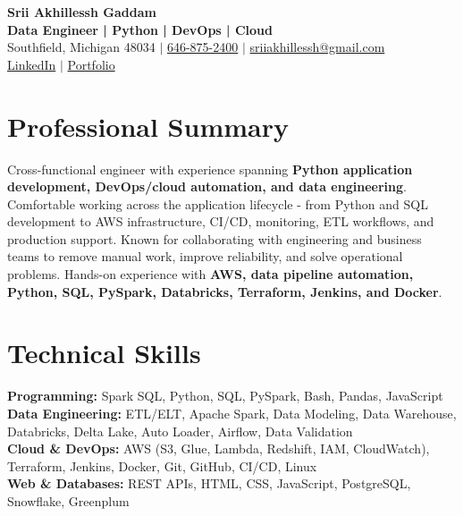 \documentclass[letterpaper,10pt]{article}
\begin{document}
\fontsize{9.35pt}{10.45pt}\selectfont

\begin{center}
    {\LARGE \textbf{Srii Akhillessh Gaddam}} \\[-1pt]
    \textbf{Data Engineer | Python | DevOps | Cloud} \\[2pt]
    Southfield, Michigan 48034 $|$
    \href{tel:6468752400}{646-875-2400} $|$
    \href{mailto:sriiakhillessh@gmail.com}{sriiakhillessh@gmail.com} \\[1pt]
    \href{https://www.linkedin.com/in/srii-akhiilessh-gaddam-b48668191/}{LinkedIn} $|$
    \href{https://sriiakhillesshg.github.io/portfolio/}{Portfolio}
\end{center}
\vspace{-8pt}

\section{Professional Summary}
\small{Cross-functional engineer with experience spanning \textbf{Python application development, DevOps/cloud automation, and data engineering}. Comfortable working across the application lifecycle - from Python and SQL development to AWS infrastructure, CI/CD, monitoring, ETL workflows, and production support. Known for collaborating with engineering and business teams to remove manual work, improve reliability, and solve operational problems. Hands-on experience with \textbf{AWS, data pipeline automation, Python, SQL, PySpark, Databricks, Terraform, Jenkins, and Docker}.}

\section{Technical Skills}
\small{
\textbf{Programming:} Spark SQL, Python, SQL, PySpark, Bash, Pandas, JavaScript \\
\textbf{Data Engineering:} ETL/ELT, Apache Spark, Data Modeling, Data Warehouse, Databricks, Delta Lake, Auto Loader, Airflow, Data Validation \\
\textbf{Cloud \& DevOps:} AWS (S3, Glue, Lambda, Redshift, IAM, CloudWatch), Terraform, Jenkins, Docker, Git, GitHub, CI/CD, Linux \\
\textbf{Web \& Databases:} REST APIs, HTML, CSS, JavaScript, PostgreSQL, Snowflake, Greenplum
}
\end{document}
